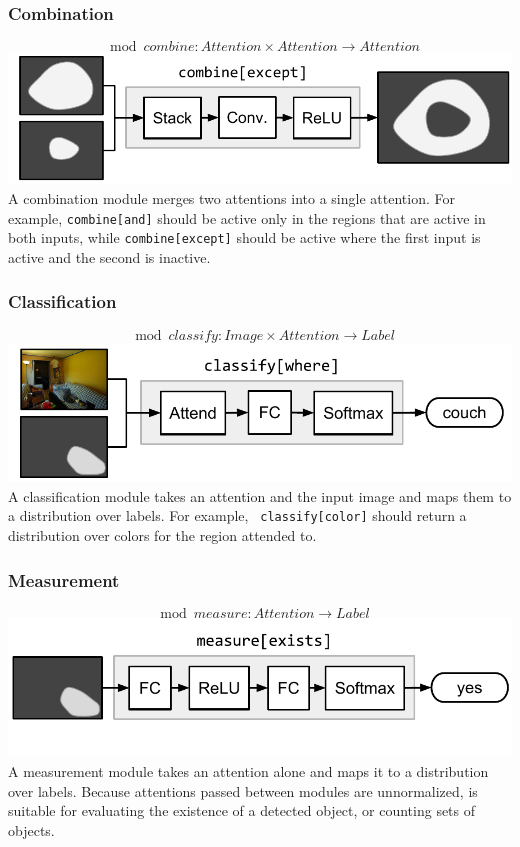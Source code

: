 \subsubsection*{Combination}
\[
  \mod{combine} : \mathit{Attention} \times \mathit{Attention} \to
  \mathit{Attention}
\]
\includegraphics[width=\columnwidth]{fig/combine}
A combination module  merges two attentions into a single
attention. For example, {\small\tt combine[and]} should be active only in the
regions that are active in both inputs, while {\small\tt{combine[except]}}
should be active where the first input is active and the second is
inactive.

\subsubsection*{Classification}
\[
  \mod{classify} : \mathit{Image} \times \mathit{Attention} \to
  \mathit{Label}
\]
\includegraphics[width=\columnwidth]{fig/classify}
A classification module  takes an attention and the input
image and maps them to a distribution over labels. For example, {\small\tt
classify[color]} should return a distribution over colors for the region
attended to.

\subsubsection*{Measurement}
\[
  \mod{measure} : \mathit{Attention} \to \mathit{Label}
\]
\includegraphics[width=\columnwidth]{fig/measure}
A measurement module  takes an attention alone and maps it to
a distribution over labels. Because attentions passed between modules are
unnormalized,  is suitable for evaluating the existence of a
detected object, or counting sets of objects.

